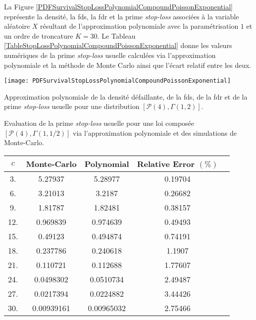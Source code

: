 La Figure \ref{PDFSurvivalStopLossPolynomialCompoundPoissonExponential} représente la densité, la \gls{fds}, la \gls{fdr} et la prime \textit{stop-loss} associées à la variable aléatoire $X$ résultant de l\rq{}approximation polynomiale avec la paramétrisation $1$ et un ordre de troncature $K=30$. Le Tableau \ref{TableStopLossPolynomialCompoundPoissonExponential} donne les valeurs numériques de la prime \textit{stop-loss} usuelle calculées via l\rq{}approximation polynomiale et la méthode de Monte Carlo ainsi que l\rq{}écart relatif entre les deux.\\
\begin{figureth}
\texttt{[image: PDFSurvivalStopLossPolynomialCompoundPoissonExponential]}
\caption{Approximation polynomiale de la densité défaillante, de la \gls{fds}, de la \gls{fdr} et de la prime \textit{stop-loss} usuelle pour une distribution $\left[\mathcal{P}(4),\Gamma(1,2)\right]$.}		
\label{PDFSurvivalStopLossPolynomialCompoundPoissonExponential}
\end{figureth}
	\begin{tableth}
		\caption[Calcul de la prime \textit{stop-loss} pour une loi $\left(\mathcal{P}(4),\Gamma(1,1/2)\right)$]{Evaluation de la prime \textit{stop-loss} usuelle pour une loi composée $\left[\mathcal{P}(4),\Gamma(1,1/2)\right]$ via l'approximation polynomiale et  des simulations de Monte-Carlo.}
			\label{TableStopLossPolynomialCompoundPoissonExponential}
		\begin{tabular}{|c||c|c|c|c|}
\hline
$c$ & Monte-Carlo & Polynomial & Relative Error $(\%)$ \\
\hline
\hline
 3. & 5.27937 & 5.28977 & 0.19704 \\
 6. & 3.21013 & 3.2187 & 0.26682 \\
 9. & 1.81787 & 1.82481 & 0.38157 \\
 12. & 0.969839 & 0.974639 & 0.49493 \\
 15. & 0.49123 & 0.494874 & 0.74191 \\
 18. & 0.237786 & 0.240618 & 1.1907 \\
 21. & 0.110721 & 0.112688 & 1.77607 \\
 24. & 0.0498302 & 0.0510734 & 2.49487 \\
 27. & 0.0217394 & 0.0224882 & 3.44426 \\
 30. & 0.00939161 & 0.00965032 & 2.75466 \\
\hline
		\end{tabular}
	\end{tableth}

